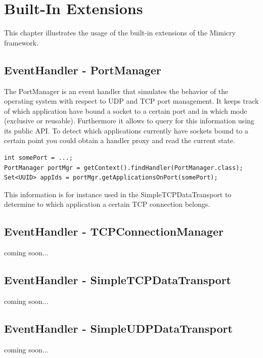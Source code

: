 \documentclass[a4paper,oneside]{book}
\begin{document}
\chapter{Built-In Extensions}
This chapter illustrates the usage of the built-in extensions of the Mimicry framework.

\section{EventHandler - PortManager}
The PortManager is an event handler that simulates the behavior of the operating system with respect to UDP and TCP port management. It keeps track of which application have bound a socket to a certain port and in which mode (exclusive or reusable). Furthermore it allows to query for this information using its public API. To detect which applications currently have sockets bound to a certain point you could obtain a handler proxy and read the current state.
\begin{lstlisting}
int somePort = ...;
PortManager portMgr = getContext().findHandler(PortManager.class);
Set<UUID> appIds = portMgr.getApplicationsOnPort(somePort);
\end{lstlisting}
This information is for instance used in the SimpleTCPDataTransport to determine to which application a certain TCP connection belongs.

\section{EventHandler - TCPConnectionManager}
coming soon...

\section{EventHandler - SimpleTCPDataTransport}
coming soon...

\section{EventHandler - SimpleUDPDataTransport}
coming soon...
\end{document}
